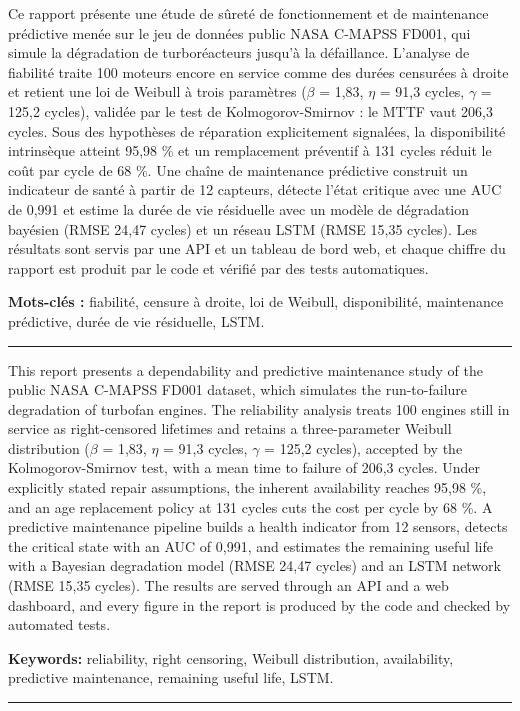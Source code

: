 \clearpage{}
\small

\par\medskip

Ce rapport présente une étude de sûreté de fonctionnement et de maintenance prédictive menée sur le jeu de données public NASA C-MAPSS FD001, qui simule la dégradation de turboréacteurs jusqu'à la défaillance. L'analyse de fiabilité traite 100 moteurs encore en service comme des durées censurées à droite et retient une loi de Weibull à trois paramètres (\ensuremath{\beta} = 1,83, \ensuremath{\eta} = 91,3 cycles, \ensuremath{\gamma} = 125,2 cycles), validée par le test de Kolmogorov-Smirnov : le MTTF vaut 206,3 cycles. Sous des hypothèses de réparation explicitement signalées, la disponibilité intrinsèque atteint 95,98 \% et un remplacement préventif à 131 cycles réduit le coût par cycle de 68 \%. Une chaîne de maintenance prédictive construit un indicateur de santé à partir de 12 capteurs, détecte l'état critique avec une AUC de 0,991 et estime la durée de vie résiduelle avec un modèle de dégradation bayésien (RMSE 24,47 cycles) et un réseau LSTM (RMSE 15,35 cycles). Les résultats sont servis par une API et un tableau de bord web, et chaque chiffre du rapport est produit par le code et vérifié par des tests automatiques.

\textbf{Mots-clés :} fiabilité, censure à droite, loi de Weibull, disponibilité, maintenance prédictive, durée de vie résiduelle, LSTM.

\par\medskip\noindent\rule{\linewidth}{0.4pt}\par\medskip
{}\par\medskip

This report presents a dependability and predictive maintenance study of the public NASA C-MAPSS FD001 dataset, which simulates the run-to-failure degradation of turbofan engines. The reliability analysis treats 100 engines still in service as right-censored lifetimes and retains a three-parameter Weibull distribution (\ensuremath{\beta} = 1,83, \ensuremath{\eta} = 91,3 cycles, \ensuremath{\gamma} = 125,2 cycles), accepted by the Kolmogorov-Smirnov test, with a mean time to failure of 206,3 cycles. Under explicitly stated repair assumptions, the inherent availability reaches 95,98 \%, and an age replacement policy at 131 cycles cuts the cost per cycle by 68 \%. A predictive maintenance pipeline builds a health indicator from 12 sensors, detects the critical state with an AUC of 0,991, and estimates the remaining useful life with a Bayesian degradation model (RMSE 24,47 cycles) and an LSTM network (RMSE 15,35 cycles). The results are served through an API and a web dashboard, and every figure in the report is produced by the code and checked by automated tests.

\textbf{Keywords:} reliability, right censoring, Weibull distribution, availability, predictive maintenance, remaining useful life, LSTM.

\par\medskip\noindent\rule{\linewidth}{0.4pt}\par\medskip
\arabicabstract
